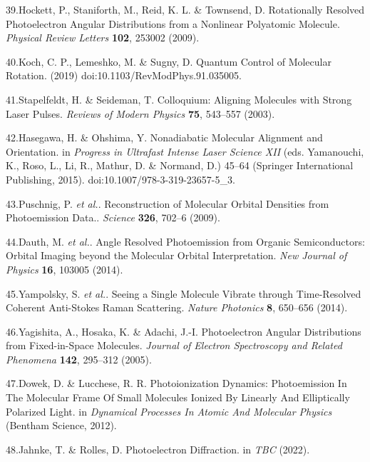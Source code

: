 \documentclass[10pt]{article}
\begin{document}
\label{csl:39}39.Hockett, P., Staniforth, M., Reid, K. L. \& Townsend, D. {Rotationally {{Resolved Photoelectron Angular Distributions}} from a {{Nonlinear Polyatomic Molecule}}}. \textit{Physical Review Letters} \textbf{102}, 253002 (2009).

\label{csl:40}40.Koch, C. P., Lemeshko, M. \& Sugny, D. {Quantum Control of Molecular Rotation}. (2019) doi:10.1103/RevModPhys.91.035005.

\label{csl:41}41.Stapelfeldt, H. \& Seideman, T. {Colloquium: {{Aligning}} Molecules with Strong Laser Pulses}. \textit{Reviews of Modern Physics} \textbf{75}, 543–557 (2003).

\label{csl:42}42.Hasegawa, H. \& Ohshima, Y. {Nonadiabatic {{Molecular Alignment}} and {{Orientation}}}. in \textit{Progress in {{Ultrafast Intense Laser Science XII}}} (eds. Yamanouchi, K., Roso, L., Li, R., Mathur, D. \& Normand, D.) 45–64 ({Springer International Publishing}, 2015). doi:10.1007/978-3-319-23657-5_3.

\label{csl:43}43.Puschnig, P. \textit{et al.}. {Reconstruction of Molecular Orbital Densities from Photoemission Data.}. \textit{Science} \textbf{326}, 702–6 (2009).

\label{csl:44}44.Dauth, M. \textit{et al.}. {Angle Resolved Photoemission from Organic Semiconductors: Orbital Imaging beyond the Molecular Orbital Interpretation}. \textit{New Journal of Physics} \textbf{16}, 103005 (2014).

\label{csl:45}45.Yampolsky, S. \textit{et al.}. {Seeing a Single Molecule Vibrate through Time-Resolved Coherent Anti-{{Stokes Raman}} Scattering}. \textit{Nature Photonics} \textbf{8}, 650–656 (2014).

\label{csl:46}46.Yagishita, A., Hosaka, K. \& Adachi, J.-I. {Photoelectron Angular Distributions from Fixed-in-Space Molecules}. \textit{Journal of Electron Spectroscopy and Related Phenomena} \textbf{142}, 295–312 (2005).

\label{csl:47}47.Dowek, D. \& Lucchese, R. R. {Photoionization {{Dynamics}}: {{Photoemission In The Molecular Frame Of Small Molecules Ionized By Linearly And Elliptically Polarized Light}}}. in \textit{Dynamical {{Processes In Atomic And Molecular Physics}}} ({Bentham Science}, 2012).

\label{csl:48}48.Jahnke, T. \& Rolles, D. {Photoelectron {{Diffraction}}}. in \textit{{{TBC}}} (2022).
\end{document}
